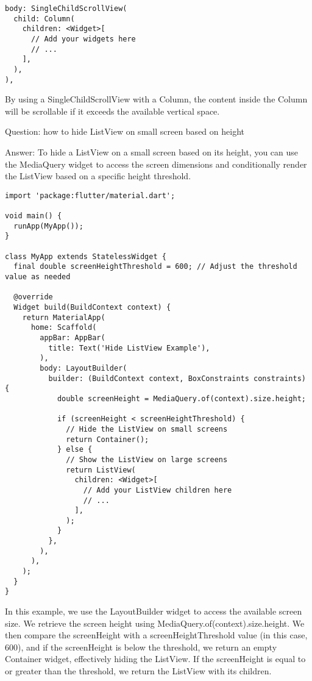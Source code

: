 \begin{lstlisting}
body: SingleChildScrollView(
  child: Column(
    children: <Widget>[
      // Add your widgets here
      // ...
    ],
  ),
),
\end{lstlisting}

By using a SingleChildScrollView with a Column, the content inside the Column will be scrollable if it exceeds the 
available vertical space.

Question: how to hide ListView on small screen based on height

Answer: To hide a ListView on a small screen based on its height, you can use the MediaQuery widget to access the 
screen dimensions and conditionally render the ListView based on a specific height threshold.

\begin{lstlisting}
import 'package:flutter/material.dart';

void main() {
  runApp(MyApp());
}

class MyApp extends StatelessWidget {
  final double screenHeightThreshold = 600; // Adjust the threshold value as needed

  @override
  Widget build(BuildContext context) {
    return MaterialApp(
      home: Scaffold(
        appBar: AppBar(
          title: Text('Hide ListView Example'),
        ),
        body: LayoutBuilder(
          builder: (BuildContext context, BoxConstraints constraints) {
            double screenHeight = MediaQuery.of(context).size.height;

            if (screenHeight < screenHeightThreshold) {
              // Hide the ListView on small screens
              return Container();
            } else {
              // Show the ListView on large screens
              return ListView(
                children: <Widget>[
                  // Add your ListView children here
                  // ...
                ],
              );
            }
          },
        ),
      ),
    );
  }
}
\end{lstlisting}

In this example, we use the LayoutBuilder widget to access the available screen size. We retrieve the screen height 
using MediaQuery.of(context).size.height. We then compare the screenHeight with a screenHeightThreshold value 
(in this case, 600), and if the screenHeight is below the threshold, we return an empty Container widget, 
effectively hiding the ListView. If the screenHeight is equal to or greater than the threshold, we return 
the ListView with its children.


